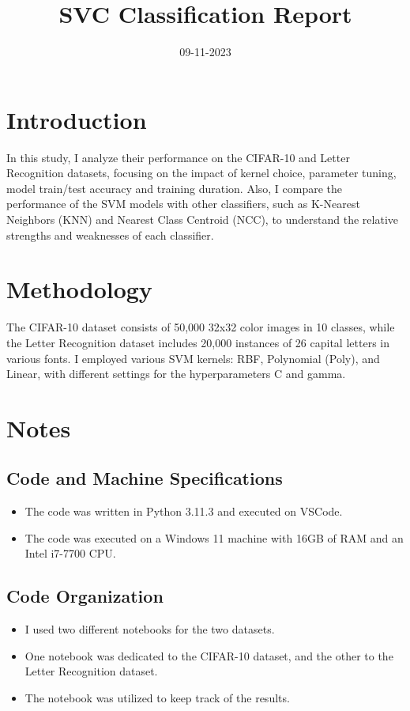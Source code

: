 \documentclass[conference]{IEEEtran}
\title{\Huge SVC Classification Report}
\author{\IEEEauthorblockN{Papagrigoriou Vasileios Savvas}
\IEEEauthorblockA{Auth}}
\date{09-11-2023}
\begin{document}
\maketitle

\section{Introduction}
In this study, I analyze their performance on the CIFAR-10 and Letter Recognition datasets, focusing on the impact of kernel choice, parameter tuning, model train/test accuracy and training duration.
Also, I compare the performance of the SVM models with other classifiers, such as K-Nearest Neighbors (KNN) and Nearest Class Centroid (NCC), to understand the relative strengths and weaknesses of each classifier.
\section{Methodology}
The CIFAR-10 dataset consists of 50,000 32x32 color images in 10 classes, while the Letter Recognition dataset includes 20,000 instances of 26 capital letters in various fonts. I employed various SVM kernels: RBF, Polynomial (Poly), and Linear, with different settings for the hyperparameters C and gamma.

\section{Notes}
\subsection{Code and Machine Specifications}

\begin{itemize}
\item The code was written in Python 3.11.3 and executed on VSCode. 
\item The code was executed on a Windows 11 machine with 16GB of RAM and an Intel i7-7700 CPU. 
\end{itemize}

\subsection{Code Organization}

\begin{itemize}
\item I used two different notebooks for the two datasets.
\item One notebook was dedicated to the CIFAR-10 dataset, and the other to the Letter Recognition dataset.
\item The notebook was utilized to keep track of the results.
\end{itemize}
\end{document}
